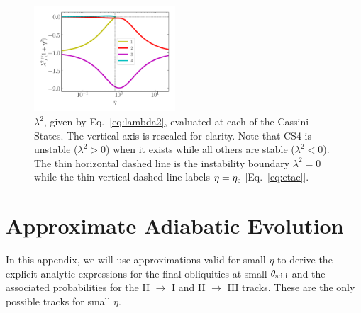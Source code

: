 \documentclass[twocolumn,twocolappendix]{aastex63}
\begin{document}
\begin{figure}
    \centering
    \includegraphics[width=0.47\textwidth]{plots_diskdisp/2_lambdas.png}
    \caption{$\lambda^2$, given by Eq.~\eqref{eq:lambda2}, evaluated at each of
    the Cassini States. The vertical axis is rescaled for clarity. Note that CS4
    is unstable ($\lambda^2 > 0$) when it exists while all others are
    stable ($\lambda^2 < 0$). The thin horizontal dashed line is the instability
    boundary $\lambda^2 = 0$ while the thin vertical dashed line labels $\eta =
    \eta_{\rm c}$ [Eq.~\eqref{eq:etac}].}\label{fig:lambda2}
\end{figure}

\section{Approximate Adiabatic Evolution}\label{s:ad_approx}

In this appendix, we will use approximations valid for small $\eta$ to derive
the explicit analytic expressions for the final obliquities at small
$\theta_{\rm sd, i}$ and the associated probabilities for the II $\to$ I and II
$\to$ III tracks. These are the only possible tracks for small $\eta$.
\end{document}
